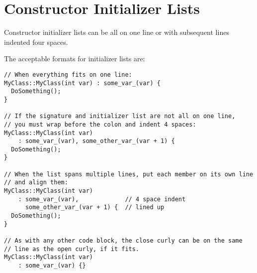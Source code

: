 
\section{Constructor Initializer Lists}\label{sec:constructor-initializer-lists}
Constructor initializer lists can be all on one line or with subsequent lines indented four spaces.

The acceptable formats for initializer lists are:

\begin{verbatim}
// When everything fits on one line:
MyClass::MyClass(int var) : some_var_(var) {
  DoSomething();
}

// If the signature and initializer list are not all on one line,
// you must wrap before the colon and indent 4 spaces:
MyClass::MyClass(int var)
    : some_var_(var), some_other_var_(var + 1) {
  DoSomething();
}

// When the list spans multiple lines, put each member on its own line
// and align them:
MyClass::MyClass(int var)
    : some_var_(var),             // 4 space indent
      some_other_var_(var + 1) {  // lined up
  DoSomething();
}

// As with any other code block, the close curly can be on the same
// line as the open curly, if it fits.
MyClass::MyClass(int var)
    : some_var_(var) {}
\end{verbatim}
